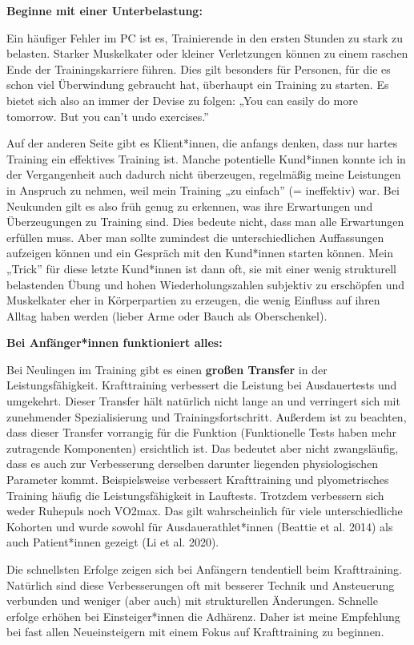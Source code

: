 \documentclass[
  letterpaper,
  DIV=11,
  numbers=noendperiod]{scrreprt}
\begin{document}
\textbf{Beginne mit einer Unterbelastung:}

Ein häufiger Fehler im PC ist es, Trainierende in den ersten Stunden zu
stark zu belasten. Starker Muskelkater oder kleiner Verletzungen können
zu einem raschen Ende der Trainingskarriere führen. Dies gilt besonders
für Personen, für die es schon viel Überwindung gebraucht hat, überhaupt
ein Training zu starten. Es bietet sich also an immer der Devise zu
folgen: „You can easily do more tomorrow. But you can't undo
exercises.''

Auf der anderen Seite gibt es Klient*innen, die anfangs denken, dass nur
hartes Training ein effektives Training ist. Manche potentielle
Kund*innen konnte ich in der Vergangenheit auch dadurch nicht
überzeugen, regelmäßig meine Leistungen in Anspruch zu nehmen, weil mein
Training „zu einfach'' (= ineffektiv) war. Bei Neukunden gilt es also
früh genug zu erkennen, was ihre Erwartungen und Überzeugungen zu
Training sind. Dies bedeute nicht, dass man alle Erwartungen erfüllen
muss. Aber man sollte zumindest die unterschiedlichen Auffassungen
aufzeigen können und ein Gespräch mit den Kund*innen starten können.
Mein „Trick'' für diese letzte Kund*innen ist dann oft, sie mit einer
wenig strukturell belastenden Übung und hohen Wiederholungszahlen
subjektiv zu erschöpfen und Muskelkater eher in Körperpartien zu
erzeugen, die wenig Einfluss auf ihren Alltag haben werden (lieber Arme
oder Bauch als Oberschenkel).

\textbf{Bei Anfänger*innen funktioniert alles:}

Bei Neulingen im Training gibt es einen \textbf{großen Transfer} in der
Leistungsfähigkeit. Krafttraining verbessert die Leistung bei
Ausdauertests und umgekehrt. Dieser Transfer hält natürlich nicht lange
an und verringert sich mit zunehmender Spezialisierung und
Trainingsfortschritt. Außerdem ist zu beachten, dass dieser Transfer
vorrangig für die Funktion (Funktionelle Tests haben mehr zutragende
Komponenten) ersichtlich ist. Das bedeutet aber nicht zwangsläufig, dass
es auch zur Verbesserung derselben darunter liegenden physiologischen
Parameter kommt. Beispielsweise verbessert Krafttraining und
plyometrisches Training häufig die Leistungsfähigkeit in Lauftests.
Trotzdem verbessern sich weder Ruhepuls noch VO2max. Das gilt
wahrscheinlich für viele unterschiedliche Kohorten und wurde sowohl für
Ausdauerathlet*innen (Beattie et al. 2014) als auch Patient*innen
gezeigt (Li et al. 2020).

Die schnellsten Erfolge zeigen sich bei Anfängern tendentiell beim
Krafttraining. Natürlich sind diese Verbesserungen oft mit besserer
Technik und Ansteuerung verbunden und weniger (aber auch) mit
strukturellen Änderungen. Schnelle erfolge erhöhen bei Einsteiger*innen
die Adhärenz. Daher ist meine Empfehlung bei fast allen Neueinsteigern
mit einem Fokus auf Krafttraining zu beginnen.
\end{document}
